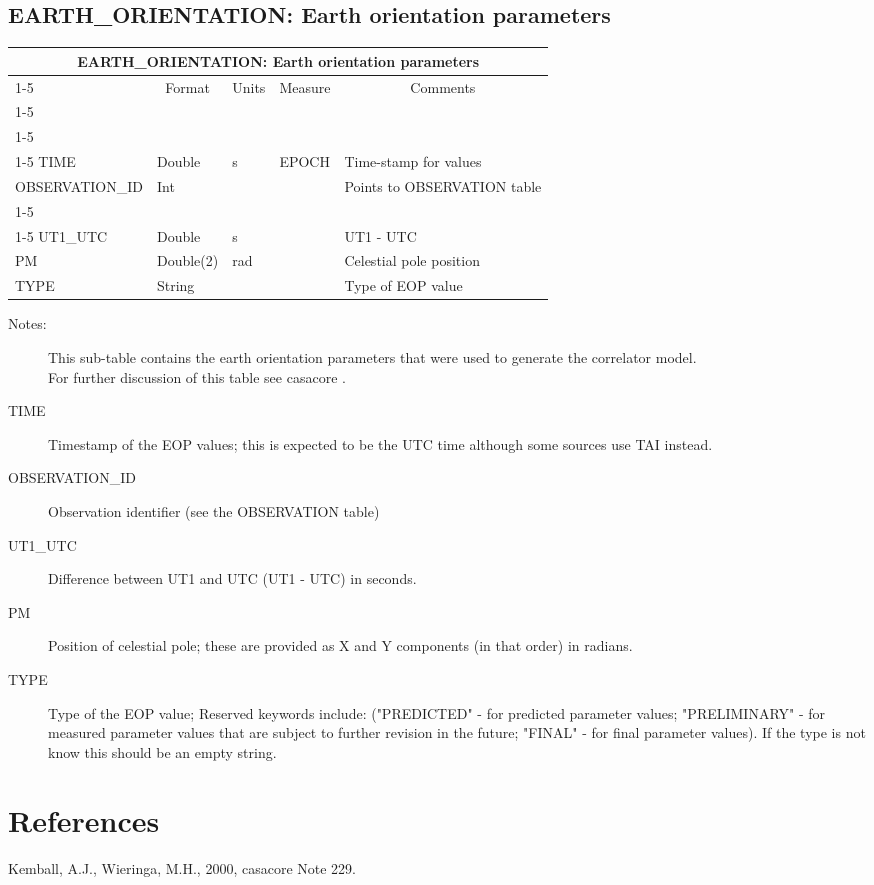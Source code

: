 \documentclass{article}
\newcommand{\defline}[1]{\cline{1-5}
\multicolumn{5}{|l|}{#1} \\
\cline{1-5}}
\newcommand{\definetable}[2]
{
	\vfill\newpage
	\subsection{#1}
        \vspace{0.15in}
        \small
	\begin{tabular}{|l|p{1.25in}|l|p{.9in}|p{1.4in}|}
	\hline
	\multicolumn{5}{|c|}{\bf #1}\\ 
	\cline{1-5}
        \multicolumn{1}{|c|}{Name}&\multicolumn{1}{|c|}{Format}&
        \multicolumn{1}{|c|}{Units}&\multicolumn{1}{|c|}{Measure}&
        \multicolumn{1}{|c|}{Comments}\\
        \cline{1-5}
        #2
        \hline
	\end{tabular}
}
\begin{document}
\definetable{EARTH\_ORIENTATION: Earth orientation parameters}
{
\defline{\bf Columns}
\defline{\bf Keys}
TIME        & Double    & s    & EPOCH & Time-stamp for values\\
OBSERVATION\_ID & Int   &      &       & Points to OBSERVATION table\\
\defline{\em Data}
UT1\_UTC    & Double    & s    &       & UT1 - UTC\\
PM          & Double(2) & rad  &       & Celestial pole position\\
TYPE        & String    &      &       & Type of EOP value\\
}
\begin{description}

\item[Notes:] This sub-table contains the earth orientation parameters
  that were used to generate the correlator model.\\
  For further discussion of this table see casacore
  .

\item[TIME] Timestamp of the EOP values; this is expected to be the
  UTC time although some sources use TAI instead.

\item[OBSERVATION\_ID] Observation identifier (see the OBSERVATION table)

\item[UT1\_UTC] Difference between UT1 and UTC (UT1 - UTC) in seconds.

\item[PM] Position of celestial pole; these are provided as X and Y
  components (in that order) in radians.

\item[TYPE] Type of the EOP value; Reserved keywords include:
  ("PREDICTED" - for predicted parameter values; "PRELIMINARY" - for
  measured parameter values that are subject to further revision in
  the future; "FINAL" - for final parameter values).  If the type is
  not know this should be an empty string.

\end{description}


\section{References}

\noindent Kemball, A.J., Wieringa, M.H., 2000, casacore Note 229.
\end{document}
